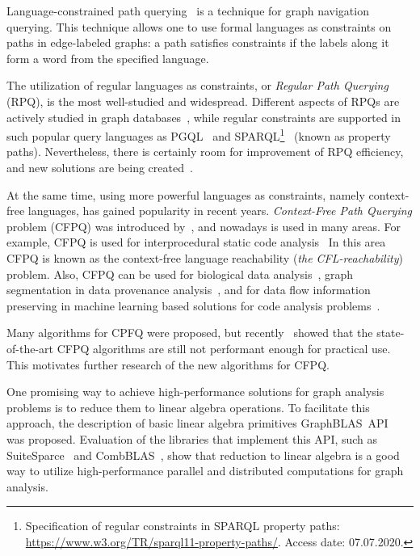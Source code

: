 
Language-constrained path querying~\cite{barrett2000formal} is a technique for graph navigation querying.
This technique allows one to use formal languages as constraints on paths in edge-labeled graphs: a path satisfies constraints if the labels along it form a word from the specified language.

The utilization of regular languages as constraints, or \textit{Regular Path Querying} (RPQ), is the most well-studied and widespread.
Different aspects of RPQs are actively studied in graph databases~\cite{10.1145/2463664.2465216, 10.1145/3104031,10.1145/2850413}, while regular constraints are supported in such popular query languages as PGQL~\cite{10.1145/2960414.2960421} and SPARQL\footnote{Specification of regular constraints in SPARQL property paths: \url{https://www.w3.org/TR/sparql11-property-paths/}. Access date: 07.07.2020.}~\cite{10.1007/978-3-319-25007-6_1} (known as property paths).
Nevertheless, there is certainly room for improvement of RPQ efficiency, and new solutions are being created~\cite{Wang2019,10.1145/2949689.2949711}.

At the same time, using more powerful languages  as constraints, namely context-free languages, has gained popularity in recent years.
\textit{Context-Free Path Querying} problem (CFPQ) was introduced by~\cite{Yannakakis}, and nowadays is used in many areas.
For example, CFPQ is used for interprocedural static code analysis~\cite{10.1145/3158118,10.5555/271338.271343, YanSCA, Zheng:2008:DAA:1328897.1328464}
In this area CFPQ is known as the context-free language reachability (\textit{the CFL-reachability}) problem.
Also, CFPQ can be used for biological data analysis~\cite{GraphQueryWithEarley}, graph segmentation in data provenance analysis~\cite{8731467}, and for data flow information preserving in machine learning based solutions for code analysis problems~\cite{10.1145/3428301}.

Many algorithms for CPFQ were proposed, but recently~\cite{Kuijpers:2019:ESC:3335783.3335791} showed that the state-of-the-art CFPQ algorithms are still not performant enough for practical use.
This motivates further research of the new algorithms for CFPQ.

One promising way to achieve high-performance solutions for graph analysis problems is to reduce them to linear algebra operations.
To facilitate this approach, the description of basic linear algebra primitives GraphBLAS~API~\cite{7761646} was proposed.
Evaluation of the libraries that implement this API, such as SuiteSparce~\cite{10.1145/3322125} and CombBLAS~\cite{10.1177/1094342011403516}, show that reduction to linear algebra is a good way to utilize high-performance parallel and distributed computations for graph analysis.

